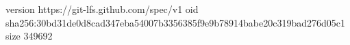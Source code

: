 version https://git-lfs.github.com/spec/v1
oid sha256:30bd31de0d8cad347eba54007b3356385f9e9b78914babe20c319bad276d05c1
size 349692
